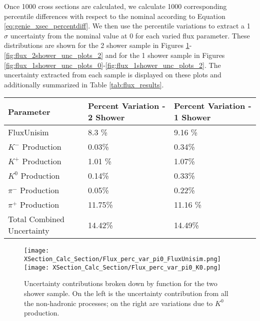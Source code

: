 
Once 1000 cross sections are calculated, we calculate 1000 corresponding percentile differences with respect to the nominal according to Equation \ref{eq:genie_xsec_percentdiff}. We then use the percentile variations to extract a 1 $\sigma$ uncertainty from the nominal value at 0 for each varied flux parameter.  These distributions are shown for the 2 shower sample in Figures \ref{fig:flux_2shower_unc_plots_0}-\ref{fig:flux_2shower_unc_plots_2} and for the 1 shower sample in Figures \ref{fig:flux_1shower_unc_plots_0}-\ref{fig:flux_1shower_unc_plots_2}. The uncertainty extracted from each sample is displayed on these plots and additionally summarized in Table \ref{tab:flux_results}.  


 \begin{table}[H]
 \centering
  \begin{tabular}{| l | l | l |}
  \hline
   Parameter & Percent Variation - 2 Shower & Percent Variation - 1 Shower  \\ [0.1ex] \hline
 FluxUnisim & 8.3 \% & 9.16 \%  \\
 $K^-$ Production & 0.03\% & 0.34\%\\
 $K^+$ Production &  1.01 \% & 1.07\% \\
 $K^0$ Production & 0.14\% & 0.33\% \\
 $\pi^-$ Production & 0.05\% & 0.22\%\\
 $\pi^+$ Production &  11.75\% & 11.16 \% \\ \hline
 Total Combined Uncertainty & 14.42\% & 14.49\%\\ \hline
\end{tabular}
\end{table}

\begin{figure}[h!]
\centering
\texttt{[image: XSection\_Calc\_Section/Flux\_perc\_var\_pi0\_FluxUnisim.png]}
\texttt{[image: XSection\_Calc\_Section/Flux\_perc\_var\_pi0\_K0.png]}
\caption{ Uncertainty contributions broken down by function for the two shower sample. On the left is the uncertainty contribution from all the non-hadronic processes; on the right are variations due to $K^0$ production. }
\label{fig:flux_2shower_unc_plots_0}
\end{figure}

